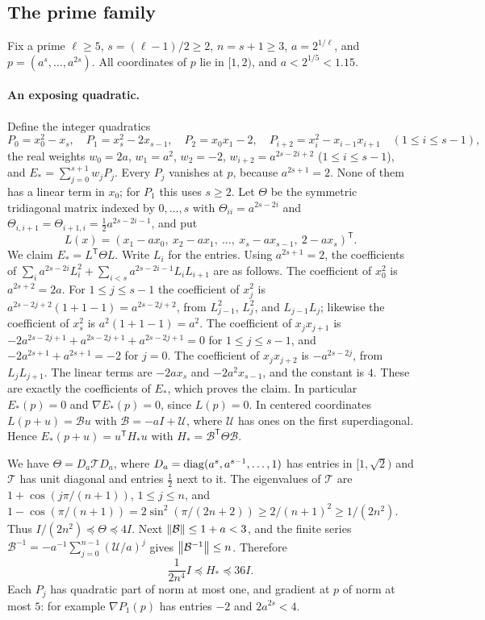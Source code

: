\subsection{The prime family}
\label{app:fields-prime}

Fix a prime $\ell\ge5$, $s=(\ell-1)/2\ge2$, $n=s+1\ge3$, $a=2^{1/\ell}$, and
$p=(a^s,\ldots,a^{2s})$. All coordinates of $p$ lie in $[1,2)$, and
$a<2^{1/5}<1.15$.

\paragraph{An exposing quadratic.}
Define the integer quadratics
\[
 P_0=x_0^2-x_s,\quad P_1=x_s^2-2x_{s-1},\quad P_2=x_0x_1-2,\quad
 P_{i+2}=x_i^2-x_{i-1}x_{i+1}\quad(1\le i\le s-1),
\]
the real weights $w_0=2a$, $w_1=a^2$, $w_2=-2$,
$w_{i+2}=a^{2s-2i+2}$ ($1\le i\le s-1$), and
$E_*=\sum_{j=0}^{s+1}w_jP_j$. Every $P_j$ vanishes at $p$, because
$a^{2s+1}=2$. None of them has a linear term in $x_0$; for $P_1$ this uses
$s\ge2$. Let $\Theta$ be the symmetric tridiagonal matrix indexed by
$0,\ldots,s$ with $\Theta_{ii}=a^{2s-2i}$ and
$\Theta_{i,i+1}=\Theta_{i+1,i}=\frac12a^{2s-2i-1}$, and put
\[
 L(x)=(x_1-ax_0,\ x_2-ax_1,\ \ldots,\ x_s-ax_{s-1},\ 2-ax_s)^{\mathsf T}.
\]
We claim $E_*=L^{\mathsf T}\Theta L$. Write $L_i$ for the entries. Using
$a^{2s+1}=2$, the coefficients of $\sum_ia^{2s-2i}L_i^2+
\sum_{i<s}a^{2s-2i-1}L_iL_{i+1}$ are as follows. The coefficient of $x_0^2$
is $a^{2s+2}=2a$. For $1\le j\le s-1$ the coefficient of $x_j^2$ is
$a^{2s-2j+2}(1+1-1)=a^{2s-2j+2}$, from $L_{j-1}^2$, $L_j^2$, and
$L_{j-1}L_j$; likewise the coefficient of $x_s^2$ is $a^2(1+1-1)=a^2$. The
coefficient of $x_jx_{j+1}$ is $-2a^{2s-2j+1}+a^{2s-2j+1}+a^{2s-2j+1}=0$ for
$1\le j\le s-1$, and $-2a^{2s+1}+a^{2s+1}=-2$ for $j=0$. The coefficient of
$x_jx_{j+2}$ is $-a^{2s-2j}$, from $L_jL_{j+1}$. The linear terms are $-2ax_s$
and $-2a^2x_{s-1}$, and the constant is $4$. These are exactly the
coefficients of $E_*$, which proves the claim. In particular $E_*(p)=0$ and
$\nabla E_*(p)=0$, since $L(p)=0$. In centered coordinates
$L(p+u)=\mathcal Bu$ with $\mathcal B=-aI+\mathcal U$, where $\mathcal U$ has
ones on the first superdiagonal. Hence $E_*(p+u)=u^{\mathsf T}H_*u$ with
$H_*=\mathcal B^{\mathsf T}\Theta\mathcal B$.

We have $\Theta=D_a\mathcal T D_a$, where
$D_a=\operatorname{diag}(a^s,a^{s-1},\ldots,1)$ has entries in $[1,\sqrt2)$ and
$\mathcal T$ has unit diagonal and entries $\frac12$ next to it. The
eigenvalues of $\mathcal T$ are $1+\cos(j\pi/(n+1))$, $1\le j\le n$, and
$1-\cos(\pi/(n+1))=2\sin^2(\pi/(2n+2))\ge2/(n+1)^2\ge1/(2n^2)$. Thus
$I/(2n^2)\preceq\Theta\preceq4I$. Next $\left\lVert\mathcal B\right\rVert\le1+a<3$, and the
finite series $\mathcal B^{-1}=-a^{-1}\sum_{j=0}^{n-1}(\mathcal U/a)^j$ gives
$\left\lVert\mathcal B^{-1}\right\rVert\le n$. Therefore
\begin{equation}
 \frac1{2n^4}I\preceq H_*\preceq36I.
 \label{eq:fields-prime-exposing-bounds}
\end{equation}
Each $P_j$ has quadratic part of norm at most one, and gradient at $p$ of
norm at most $5$: for example $\nabla P_1(p)$ has entries $-2$ and
$2a^{2s}<4$.

